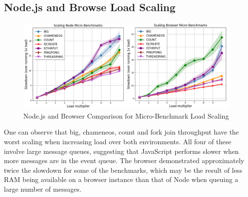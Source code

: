 \documentclass[12pt, a4paper]{report}
\theoremstyle{definition}
\theoremstyle{definition}%
\theoremstyle{definition}%
\theoremstyle{definition}%
\theoremstyle{definition}%
\theoremstyle{definition}%
\begin{document}
\subsection{Node.js and Browse Load Scaling}
\begin{figure}[H]
    \begin{centering}
        \includegraphics[width=\textwidth]{resources/load_scaling.png}
        \caption{Node.js and Browser Comparison for Micro-Benchmark Load Scaling}
    \end{centering}
\end{figure}
One can observe that big, chameneos, count and fork join throughput have the worst scaling when increasing load over both environments. All four of these involve large message queues, suggesting that JavaScript performs slower when more messages are in the event queue. The browser demonstrated approximately twice the slowdown for some of the benchmarks, which may be the result of less RAM being available on a browser instance than that of Node when queuing a large number of messages.
\end{document}
